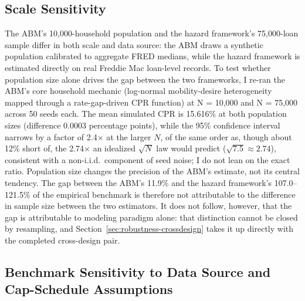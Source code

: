 \documentclass[12pt]{article}
\begin{document}
\subsection{Scale Sensitivity}\label{sec:robustness-scale}

The ABM's 10,000-household population and the hazard framework's 75,000-loan sample differ in both scale and data source: the ABM draws a synthetic population calibrated to aggregate FRED medians, while the hazard framework is estimated directly on real Freddie Mac loan-level records. To test whether population size alone drives the gap between the two frameworks, I re-ran the ABM's core household mechanic (log-normal mobility-desire heterogeneity mapped through a rate-gap-driven CPR function) at N = 10,000 and N = 75,000 across 50 seeds each. The mean simulated CPR is 15.616\% at both population sizes (difference 0.0003 percentage points), while the 95\% confidence interval narrows by a factor of 2.4$\times$ at the larger $N$, of the same order as, though about 12\% short of, the 2.74$\times$ an idealized $\sqrt{N}$ law would predict ($\sqrt{7.5} \approx 2.74$), consistent with a non-i.i.d.\ component of seed noise; I do not lean on the exact ratio. Population size changes the precision of the ABM's estimate, not its central tendency. The gap between the ABM's 11.9\% and the hazard framework's 107.0--121.5\% of the empirical benchmark is therefore not attributable to the difference in sample size between the two estimators. It does not follow, however, that the gap is attributable to modeling paradigm alone: that distinction cannot be closed by resampling, and Section~\ref{sec:robustness-crossdesign} takes it up directly with the completed cross-design pair.

\subsection{Benchmark Sensitivity to Data Source and Cap-Schedule Assumptions}\label{sec:robustness-benchmark}
\end{document}
